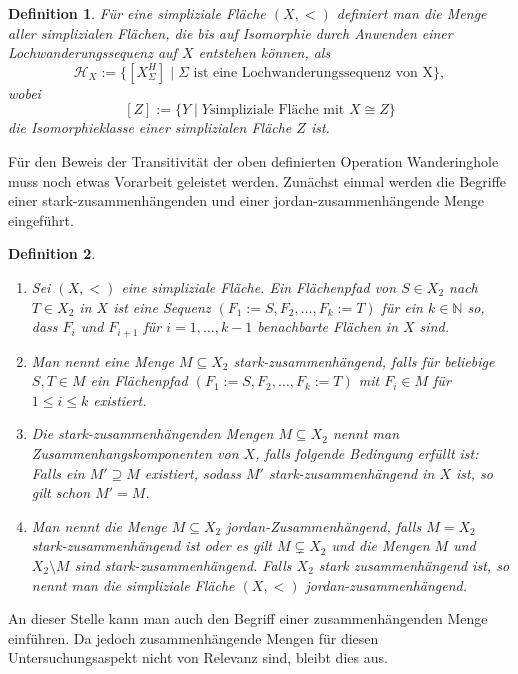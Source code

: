 \documentclass[12pt,titlepage]{article}
\newtheorem{definition}{Definition}[section]
\begin{document}
\begin{definition}
Für eine simpliziale Fläche $(X,<)$ definiert man die Menge aller simplizialen Flächen, die bis auf Isomorphie durch Anwenden einer Lochwanderungssequenz auf $X$ entstehen können, als
\[
\mathcal{H}_X:=\{[X_{\Sigma}^H] \mid \Sigma \text{ ist eine Lochwanderungssequenz von X}\},
\]
wobei
\[
 [Z] := \{Y \mid Y \text{simpliziale Fläche mit } X \cong Z\}
\] die \emph{Isomorphieklasse} einer simplizialen Fläche  $Z$ ist. 

\end{definition}

Für den Beweis der Transitivität der oben definierten Operation Wanderinghole muss noch etwas Vorarbeit geleistet werden.
Zunächst einmal werden die Begriffe einer stark-zusammenhängenden und einer jordan-zusammenhängende Menge eingeführt.
\begin{definition} 

\begin{enumerate}$\textcolor{blue}{(neu)}$
\item Sei $(X,<)$ eine simpliziale Fläche. Ein \emph{Flächenpfad} von $S\in X_{2}$ nach $T \in X_{2}$ in $X$ ist eine Sequenz $(F_1:=S,F_{2},\ldots,F_{k}:=T)$ für ein $k \in \mathbb{N}$ so, dass $F_{i} $ und $F_{i+1}$ für $i=1,\ldots,k-1$ benachbarte Flächen in $X$ sind.
\item Man nennt eine Menge $M\subseteq X_2$  \emph{stark-zusammenhängend}, falls für beliebige $S,T \in M$ ein Flächenpfad $(F_{1}:=S,F_{2},\ldots,F_{k}:=T)$ mit $F_i \in M$ für $1\leq i \leq k$ existiert. 
 \item Die stark-zusammenhängenden Mengen $M\subseteq X_2$ nennt man \emph{Zusammenhangskomponenten von $X$}, falls folgende Bedingung erfüllt ist: Falls ein $M'\supseteq M$ existiert, sodass $M'$ stark-zusammenhängend in $X$ ist, so gilt schon $M'=M$.
 \item Man nennt die Menge $M \subseteq X_2$ \emph{jordan-Zusammenhängend}, falls $M=X_2$ stark-zusammenhängend ist oder es gilt $M \subsetneq X_2$ und die Mengen $M$ und $X_2\setminus M$ sind stark-zusammenhängend. Falls $X_2$ stark zusammenhängend ist, so nennt man die simpliziale Fläche $(X,<)$ jordan-zusammenhängend.
\end {enumerate}
\end{definition}
An dieser Stelle kann man auch den Begriff einer zusammenhängenden Menge einführen. Da jedoch zusammenhängende Mengen für diesen Untersuchungsaspekt nicht von Relevanz sind, bleibt dies aus.
\end{document}
